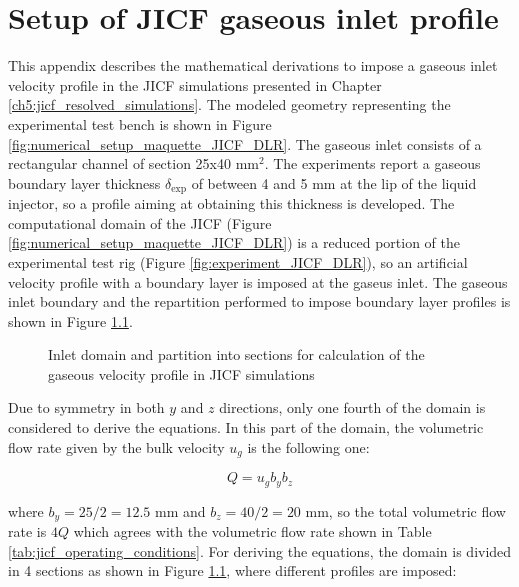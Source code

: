 \chapter{Setup of JICF gaseous inlet profile}
\label{app:JICF_BL_setup}

This appendix describes the mathematical derivations to impose a gaseous inlet velocity profile in the JICF simulations presented in Chapter \ref{ch5:jicf_resolved_simulations}. The modeled geometry representing the experimental test bench is shown in Figure \ref{fig:numerical_setup_maquette_JICF_DLR}. The gaseous inlet consists of a rectangular channel of section 25x40 mm$^2$. The experiments  report a gaseous boundary layer thickness $\delta_\mathrm{exp}$ of between 4 and 5 mm at the lip of the liquid injector, so a profile aiming at obtaining this thickness is developed. The computational domain of the JICF (Figure \ref{fig:numerical_setup_maquette_JICF_DLR}) is a reduced portion of the experimental test rig (Figure \ref{fig:experiment_JICF_DLR}), so an artificial velocity profile with a boundary layer is imposed at the gaseus inlet. The gaseous inlet boundary and the repartition performed to impose boundary layer profiles is shown in Figure \ref{fig:domain_partition_3D_profile}.


\begin{figure}[h!]	
	\centering
%	
	\caption{Inlet domain and partition into sections for calculation of the gaseous velocity profile in JICF simulations}
	\label{fig:domain_partition_3D_profile}
\end{figure}



Due to symmetry in both $y$ and $z$ directions, only one fourth of the domain is considered to derive the equations. In this part of the domain, the volumetric flow rate given by the bulk velocity $u_g$ is the following one:

\begin{equation}
\label{eq:volumetric_flow_rate_2D}
Q = u_g b_y b_z
\end{equation}	

where $b_y = 25/2 = 12.5$ mm and $b_z = 40/2 = 20$ mm, so the total volumetric flow rate is $4Q$ which agrees with the volumetric flow rate shown in Table \ref{tab:jicf_operating_conditions}. For deriving the equations, the domain is divided in 4 sections as shown in Figure \ref{fig:domain_partition_3D_profile}, where different profiles are imposed:

